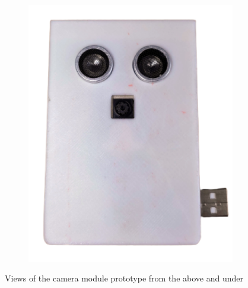 \begin{figure}[H]
\begin{subfigure}[b]{0.46\textwidth}
		\includegraphics[width=\textwidth]{img/Chap5/Prototype_View_under.png}
	\end{subfigure}
	\caption{Views of the camera module prototype from the above and under}
\end{figure}


